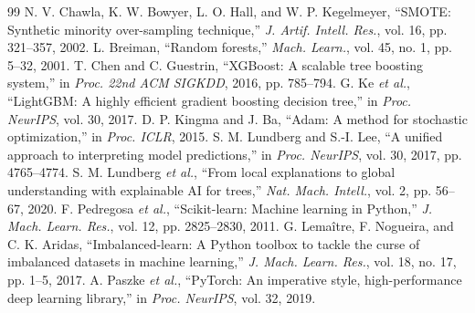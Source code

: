 \begin{thebibliography}{99}
 N. V. Chawla, K. W. Bowyer, L. O. Hall, and W. P. Kegelmeyer, ``SMOTE: Synthetic minority over-sampling technique,'' \textit{J. Artif. Intell. Res.}, vol. 16, pp. 321--357, 2002.
 L. Breiman, ``Random forests,'' \textit{Mach. Learn.}, vol. 45, no. 1, pp. 5--32, 2001.
 T. Chen and C. Guestrin, ``XGBoost: A scalable tree boosting system,'' in \textit{Proc. 22nd ACM SIGKDD}, 2016, pp. 785--794.
 G. Ke \textit{et al.}, ``LightGBM: A highly efficient gradient boosting decision tree,'' in \textit{Proc. NeurIPS}, vol. 30, 2017.
 D. P. Kingma and J. Ba, ``Adam: A method for stochastic optimization,'' in \textit{Proc. ICLR}, 2015.
 S. M. Lundberg and S.-I. Lee, ``A unified approach to interpreting model predictions,'' in \textit{Proc. NeurIPS}, vol. 30, 2017, pp. 4765--4774.
 S. M. Lundberg \textit{et al.}, ``From local explanations to global understanding with explainable AI for trees,'' \textit{Nat. Mach. Intell.}, vol. 2, pp. 56--67, 2020.
 F. Pedregosa \textit{et al.}, ``Scikit-learn: Machine learning in Python,'' \textit{J. Mach. Learn. Res.}, vol. 12, pp. 2825--2830, 2011.
 G. Lema\^{i}tre, F. Nogueira, and C. K. Aridas, ``Imbalanced-learn: A Python toolbox to tackle the curse of imbalanced datasets in machine learning,'' \textit{J. Mach. Learn. Res.}, vol. 18, no. 17, pp. 1--5, 2017.
 A. Paszke \textit{et al.}, ``PyTorch: An imperative style, high-performance deep learning library,'' in \textit{Proc. NeurIPS}, vol. 32, 2019.
\end{thebibliography}